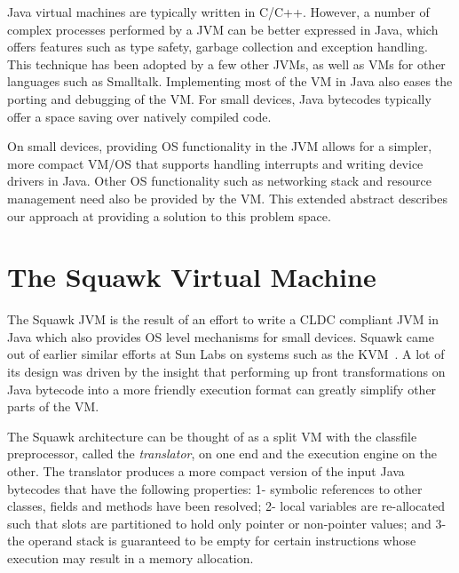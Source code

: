\documentclass{sig-alt-sun}
\begin{document}
Java virtual machines are typically written in C/C++. However, a number of
complex processes performed by a JVM can be better expressed in Java, which
offers features such as type safety, garbage collection and exception handling.
This technique has been adopted by a few other JVMs, as well as VMs for
other languages such as Smalltalk\cite{Inga97}. Implementing most of the
VM in Java also eases the porting and debugging of the VM.  For small devices, 
Java bytecodes typically offer a space saving over natively compiled
code.

%

On small devices, providing OS functionality in the JVM allows for 
a simpler, more compact VM/OS that supports handling interrupts and
writing device drivers in Java.  Other OS functionality such as networking
stack and resource management need also be provided by the VM.  
This extended abstract describes our approach at providing a solution 
to this problem space.

\vfill\eject
\section{The Squawk Virtual Machine}

The Squawk JVM is the result of an effort to write a CLDC compliant
JVM in Java which also provides OS level mechanisms for small 
devices.  
Squawk came out of earlier similar efforts at Sun Labs on systems such 
as the KVM~\cite{Taiv99}.
A lot of its design was driven by the insight that performing up front
transformations on Java bytecode into a more friendly execution format
can greatly simplify other parts of the VM. 

The Squawk architecture can be thought of as a split VM with the classfile
preprocessor, called the {\em translator}, on one end and the execution
engine on the other. The translator produces a more compact
version of the input Java bytecodes that have the following properties: 
1- symbolic references to other classes, fields and methods have been
resolved;
2- local variables are re-allocated such that slots 
are partitioned to hold only pointer or non-pointer values; 
and 3- the operand stack is guaranteed
to be empty for certain instructions whose execution may result in a
memory allocation. 
\end{document}
